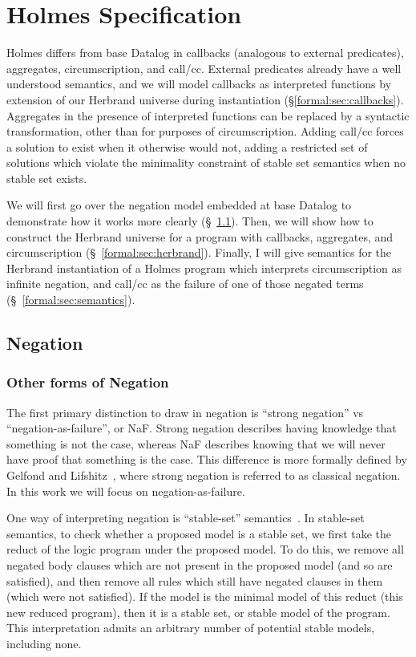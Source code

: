 
\chapter{Holmes Specification}
\label{chap:formal}
Holmes differs from base Datalog in callbacks (analogous to external predicates), aggregates, circumscription, and call/cc.
External predicates already have a well understood semantics, and we will model callbacks as interpreted functions by extension of our Herbrand universe during instantiation (\S \ref{formal:sec:callbacks}).
Aggregates in the presence of interpreted functions can be replaced by a syntactic transformation, other than for purposes of circumscription.
Adding call/cc forces a solution to exist when it otherwise would not, adding a restricted set of solutions which violate the minimality constraint of stable set semantics when no stable set exists.

We will first go over the negation model embedded at base Datalog to demonstrate how it works more clearly (\S~\ref{formal:sec:negation}).
Then, we will show how to construct the Herbrand universe for a program with callbacks, aggregates, and circumscription (\S~\ref{formal:sec:herbrand}).
Finally, I will give semantics for the Herbrand instantiation of a Holmes program which interprets circumscription as infinite negation, and call/cc as the failure of one of those negated terms (\S~\ref{formal:sec:semantics}).
\section{Negation}
\label{formal:sec:negation}
\subsection{Other forms of Negation}
\label{formal:sec:otherneg}
The first primary distinction to draw in negation is ``strong negation'' vs ``negation-as-failure'', or NaF.
Strong negation describes having knowledge that something is not the case, whereas NaF describes knowing that we will never have proof that something is the case.
This difference is more formally defined by Gelfond and Lifshitz~\cite{strongneg}, where strong negation is referred to as classical negation.
In this work we will focus on negation-as-failure.

One way of interpreting negation is ``stable-set'' semantics~\cite{stablemodel}.
In stable-set semantics, to check whether a proposed model is a stable set, we first take the reduct of the logic program under the proposed model.
To do this, we remove all negated body clauses which are not present in the proposed model (and so are satisfied), and then remove all rules which still have negated clauses in them (which were not satisfied).
If the model is the minimal model of this reduct (this new reduced program), then it is a stable set, or stable model of the program.
This interpretation admits an arbitrary number of potential stable models, including none.

